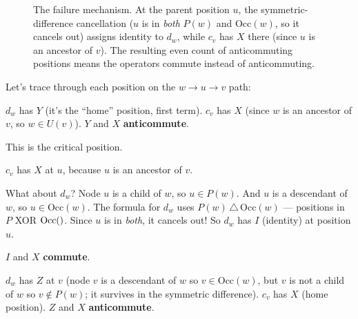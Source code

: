 \documentclass[11pt,a4paper]{article}
\newcommand{\Occ}[1]{\mathrm{Occ}(#1)}
\theoremstyle{definition}
\begin{document}
\begin{figure}[h]
\caption{The failure mechanism.  At the parent position $u$, the
symmetric-difference cancellation ($u$ is in \emph{both} $P(w)$ and
$\Occ{w}$, so it cancels out) assigns identity to $d_w$, while $c_v$
has $X$ there (since $u$ is an ancestor of $v$).  The resulting even
count of anticommuting positions means the operators commute instead
of anticommuting.}
\label{fig:failure-mechanism}
\end{figure}

Let's trace through each position on the $w \to u \to v$ path:

\begin{description}[leftmargin=2cm, font=\bfseries]
  \item[Position $w$:]
    $d_w$ has $Y$ (it's the ``home'' position, first term).
    $c_v$ has $X$ (since $w$ is an ancestor of $v$, so $w \in U(v)$).
    $Y$ and $X$ \textbf{anticommute}.

  \item[Position $u$:]
    This is the critical position.

    $c_v$ has $X$ at $u$, because $u$ is an ancestor of $v$.

    What about $d_w$?  Node $u$ is a child of $w$, so
    $u \in P(w)$.  And $u$ is a descendant of $w$, so
    $u \in \Occ{w}$.  The formula for $d_w$ uses
    $P(w) \,\triangle\, \Occ{w}$ --- positions in $P$ XOR $\Occ$.
    Since $u$ is in \emph{both}, it cancels out!  So $d_w$ has
    $I$ (identity) at position $u$.

    $I$ and $X$ \textbf{commute}.

  \item[Position $v$:]
    $d_w$ has $Z$ at $v$ (node $v$ is a descendant of $w$ so
    $v \in \Occ{w}$, but $v$ is not a child of $w$ so
    $v \notin P(w)$; it survives in the symmetric difference).
    $c_v$ has $X$ (home position).
    $Z$ and $X$ \textbf{anticommute}.
\end{description}
\end{document}
